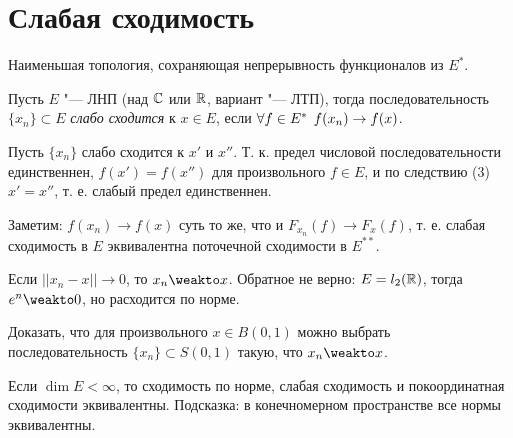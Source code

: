 \documentclass[main]{subfiles}
\begin{document}
\section{Слабая сходимость}

Наименьшая топология, сохраняющая непрерывность функционалов из $E^*$.

\begin{definition}
  Пусть $E$ "--- ЛНП (над $\mathbb{C}$ или $\mathbb{R}$, вариант "--- ЛТП),
  тогда последовательность $\{ x_n \} \subset E$ \emph{слабо сходится} к
  $x \in E$, если $\forall {f \in E^*} \; \, f(x_n) \to f(x)$.
\end{definition}

\begin{remark}
  Пусть $\{ x_n \}$ слабо сходится к $x'$ и $x''$.
  Т. к. предел числовой последовательности единственнен,
  $f(x') = f(x'')$ для произвольного $f \in E$, и по следствию
  (3) $x' = x''$, т. е. слабый предел единственнен.
\end{remark}

Заметим: $f(x_n) \to f(x)$ суть то же, что и
$F_{x_n}(f) \to F_x(f)$, т. е. слабая сходимость
в $E$ эквивалентна поточечной сходимости в $E^{**}$.

Если $||x_n - x|| \to 0$, то $x_n \weakto x$.
Обратное не верно: $E = l_2(\mathbb{R})$, тогда
$e^n \weakto 0$, но расходится по норме.

\begin{exercise}
  Доказать, что для произвольного $x \in B(0, 1)$
  можно выбрать последовательность $\{ x_n \} \subset S(0, 1)$
  такую, что $x_n \weakto x$.
\end{exercise}

\begin{exercise}
  Если $\dim E < \infty$, то сходимость по норме, слабая сходимость
  и покоординатная сходимости эквивалентны.
  Подсказка: в конечномерном пространстве все нормы эквивалентны.
\end{exercise}
\end{document}
